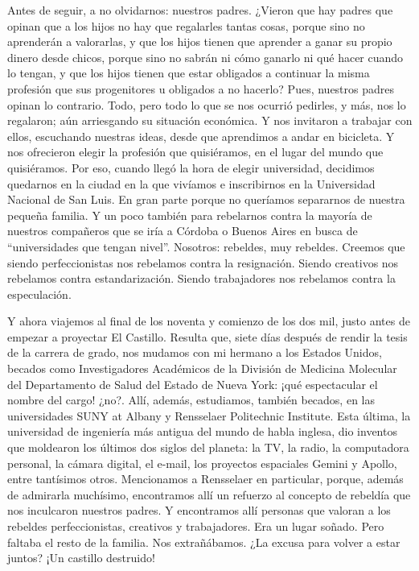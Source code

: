 \documentclass[
]{article}
\begin{document}
Antes de seguir, a no olvidarnos: nuestros padres. ¿Vieron que hay
padres que opinan que a los hijos no hay que regalarles tantas cosas,
porque sino no aprenderán a valorarlas, y que los hijos tienen que
aprender a ganar su propio dinero desde chicos, porque sino no sabrán ni
cómo ganarlo ni qué hacer cuando lo tengan, y que los hijos tienen que
estar obligados a continuar la misma profesión que sus progenitores u
obligados a no hacerlo? Pues, nuestros padres opinan lo contrario. Todo,
pero todo lo que se nos ocurrió pedirles, y más, nos lo regalaron; aún
arriesgando su situación económica. Y nos invitaron a trabajar con
ellos, escuchando nuestras ideas, desde que aprendimos a andar en
bicicleta. Y nos ofrecieron elegir la profesión que quisiéramos, en el
lugar del mundo que quisiéramos. Por eso, cuando llegó la hora de elegir
universidad, decidimos quedarnos en la ciudad en la que vivíamos e
inscribirnos en la Universidad Nacional de San Luis. En gran parte
porque no queríamos separarnos de nuestra pequeña familia. Y un poco
también para rebelarnos contra la mayoría de nuestros compañeros que se
iría a Córdoba o Buenos Aires en busca de ``universidades que tengan
nivel''. Nosotros: rebeldes, muy rebeldes. Creemos que siendo
perfeccionistas nos rebelamos contra la resignación. Siendo creativos
nos rebelamos contra estandarización. Siendo trabajadores nos rebelamos
contra la especulación.

Y ahora viajemos al final de los noventa y comienzo de los dos mil,
justo antes de empezar a proyectar El Castillo. Resulta que, siete días
después de rendir la tesis de la carrera de grado, nos mudamos con mi
hermano a los Estados Unidos, becados como Investigadores Académicos de
la División de Medicina Molecular del Departamento de Salud del Estado
de Nueva York: ¡qué espectacular el nombre del cargo! ¿no?. Allí,
además, estudiamos, también becados, en las universidades SUNY at Albany
y Rensselaer Politechnic Institute. Esta última, la universidad de
ingeniería más antigua del mundo de habla inglesa, dio inventos que
moldearon los últimos dos siglos del planeta: la TV, la radio, la
computadora personal, la cámara digital, el e-mail, los proyectos
espaciales Gemini y Apollo, entre tantísimos otros. Mencionamos a
Rensselaer en particular, porque, además de admirarla muchísimo,
encontramos allí un refuerzo al concepto de rebeldía que nos inculcaron
nuestros padres. Y encontramos allí personas que valoran a los rebeldes
perfeccionistas, creativos y trabajadores. Era un lugar soñado. Pero
faltaba el resto de la familia. Nos extrañábamos. ¿La excusa para volver
a estar juntos? ¡Un castillo destruido!
\end{document}

